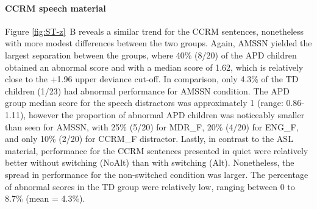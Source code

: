 \documentclass[a4paper, twoside]{templates/ociamthesis}
\begin{document}
\hypertarget{ccrm-speech-material}{%
\paragraph*{CCRM speech material}\label{ccrm-speech-material}}

\hfill\break
Figure \ref{fig:ST-z}~B reveals a similar trend for the CCRM sentences, nonetheless with more modest differences between the two groups. Again, AMSSN yielded the largest separation between the groups, where 40\% (8/20) of the APD children obtained an abnormal score and with a median score of 1.62, which is relatively close to the +1.96 upper deviance cut-off. In comparison, only 4.3\% of the TD children (1/23) had abnormal performance for AMSSN condition. The APD group median score for the speech distractors was approximately 1 (range: 0.86-1.11), however the proportion of abnormal APD children was noticeably smaller than seen for AMSSN, with 25\% (5/20) for MDR\_F, 20\% (4/20) for ENG\_F, and only 10\% (2/20) for CCRM\_F distractor. Lastly, in contrast to the ASL material, performance for the CCRM sentences presented in quiet were relatively better without switching (NoAlt) than with switching (Alt). Nonetheless, the spread in performance for the non-switched condition was larger. The percentage of abnormal scores in the TD group were relatively low, ranging between 0 to 8.7\% (mean = 4.3\%).\\
\end{document}
